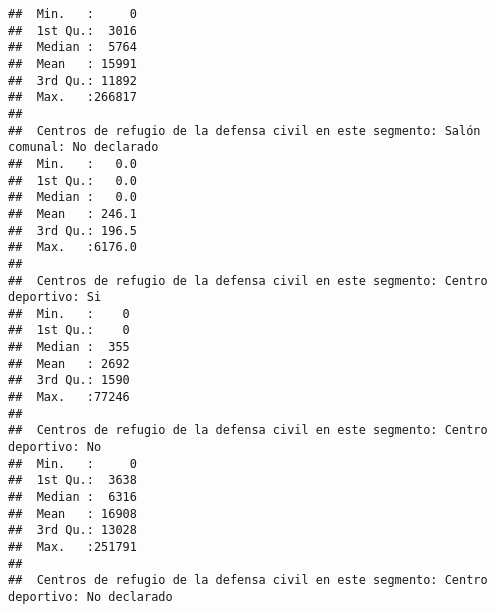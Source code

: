 \documentclass[11pt,]{article}
\begin{document}
\begin{verbatim}
##  Min.   :     0                                                            
##  1st Qu.:  3016                                                            
##  Median :  5764                                                            
##  Mean   : 15991                                                            
##  3rd Qu.: 11892                                                            
##  Max.   :266817                                                            
##                                                                            
##  Centros de refugio de la defensa civil en este segmento: Salón comunal: No declarado
##  Min.   :   0.0                                                                      
##  1st Qu.:   0.0                                                                      
##  Median :   0.0                                                                      
##  Mean   : 246.1                                                                      
##  3rd Qu.: 196.5                                                                      
##  Max.   :6176.0                                                                      
##                                                                                      
##  Centros de refugio de la defensa civil en este segmento: Centro deportivo: Si
##  Min.   :    0                                                                
##  1st Qu.:    0                                                                
##  Median :  355                                                                
##  Mean   : 2692                                                                
##  3rd Qu.: 1590                                                                
##  Max.   :77246                                                                
##                                                                               
##  Centros de refugio de la defensa civil en este segmento: Centro deportivo: No
##  Min.   :     0                                                               
##  1st Qu.:  3638                                                               
##  Median :  6316                                                               
##  Mean   : 16908                                                               
##  3rd Qu.: 13028                                                               
##  Max.   :251791                                                               
##                                                                               
##  Centros de refugio de la defensa civil en este segmento: Centro deportivo: No declarado

\end{verbatim}
\end{document}
